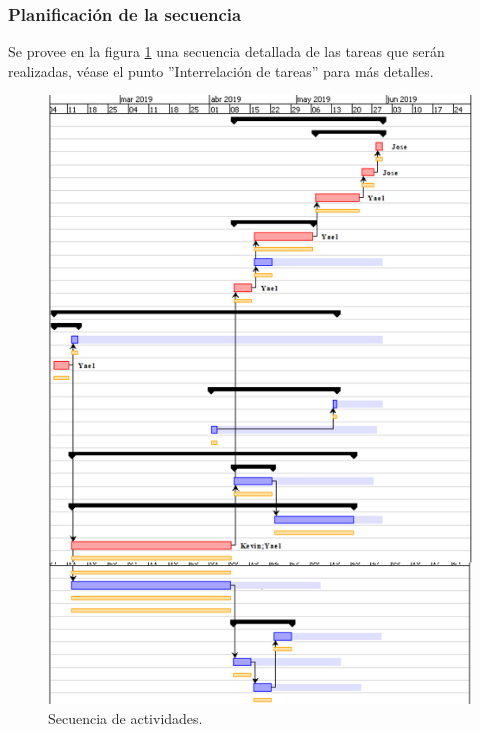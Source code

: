 \documentclass[]{article}
\begin{document}
\subsubsection{Planificaci\'on de la secuencia}
Se provee en la figura \ref{secuencia} una secuencia detallada de las tareas que ser\'an realizadas, v\'ease el punto ''Interrelaci\'on de tareas'' para m\'as detalles.
\begin{figure}[H]
	
	\centering
	\includegraphics[width=1\textwidth]{secuencia}
	\caption{Secuencia de actividades.} 
	\label{secuencia}
	
\end{figure} 
\end{document}
